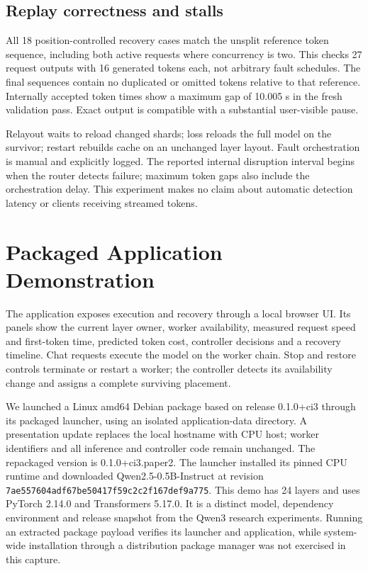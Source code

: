 \documentclass[conference]{IEEEtran}
\begin{document}
\hypertarget{replay-correctness-and-stalls}{%
\subsection{Replay correctness and
stalls}\label{replay-correctness-and-stalls}}

All 18 position-controlled recovery cases match the unsplit reference
token sequence, including both active requests where concurrency is two.
This checks 27 request outputs with 16 generated tokens each, not
arbitrary fault schedules. The final sequences contain no duplicated or
omitted tokens relative to that reference. Internally accepted token
times show a maximum gap of 10.005 s in the fresh validation pass. Exact
output is compatible with a substantial user-visible pause.

Relayout waits to reload changed shards; loss reloads the full model on
the survivor; restart rebuilds cache on an unchanged layer layout. Fault
orchestration is manual and explicitly logged. The reported internal
disruption interval begins when the router detects failure; maximum
token gaps also include the orchestration delay. This experiment makes
no claim about automatic detection latency or clients receiving streamed
tokens.

\hypertarget{packaged-application-demonstration}{%
\section{Packaged Application
Demonstration}\label{packaged-application-demonstration}}

The application exposes execution and recovery through a local browser
UI. Its panels show the current layer owner, worker availability,
measured request speed and first-token time, predicted token cost,
controller decisions and a recovery timeline. Chat requests execute the
model on the worker chain. Stop and restore controls terminate or
restart a worker; the controller detects its availability change and
assigns a complete surviving placement.

We launched a Linux amd64 Debian package based on release 0.1.0+ci3
through its packaged launcher, using an isolated application-data
directory. A presentation update replaces the local hostname with CPU
host; worker identifiers and all inference and controller code remain
unchanged. The repackaged version is 0.1.0+ci3.paper2. The launcher
installed its pinned CPU runtime and downloaded Qwen2.5-0.5B-Instruct at
revision \texttt{7ae557604adf67be50417f59c2c2f167def9a775}. This demo
has 24 layers and uses PyTorch 2.14.0 and Transformers 5.17.0. It is a
distinct model, dependency environment and release snapshot from the
Qwen3 research experiments. Running an extracted package payload
verifies its launcher and application, while system-wide installation
through a distribution package manager was not exercised in this
capture.
\end{document}
